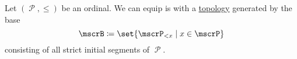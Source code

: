 \begin{definition}\label{def:well_ordered_topology}
  Let \( (\mscrP, \leq) \) be an ordinal. We can equip is with a \hyperref[def:topological_space]{topology} generated by the base
  \begin{equation*}
    \mscrB \coloneqq \set{ \mscrP_{<x} \given x \in \mscrP }
  \end{equation*}
  consisting of all strict initial segments of \( \mscrP \).
\end{definition}
